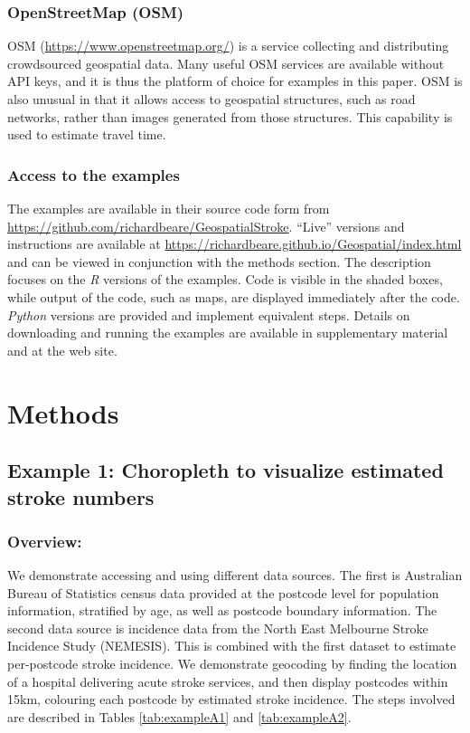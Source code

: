 \documentclass[utf8]{frontiersHLTH}
\begin{document}
\subsubsection{OpenStreetMap (OSM)}\label{openstreetmap-osm} OSM (\url{https://www.openstreetmap.org/}) is a service collecting and distributing crowdsourced geospatial data. Many useful OSM services are available without API keys, and it is thus the platform of choice for examples in this paper. OSM is also unusual in that it allows access to geospatial structures, such as road networks, rather than images generated from those structures. This capability is used to estimate travel time. 

\subsubsection{Access to the examples}\label{access-to-the-examples} The examples are available in their source code form from \href{https://github.com/richardbeare/GeospatialStroke}{https://github.com/richardbeare/GeospatialStroke}. ``Live'' versions and instructions are available at \href{https://richardbeare.github.io/Geospatial/index.html}{https://richardbeare.github.io/Geospatial/index.html} and can be viewed in conjunction with the methods section. The description focuses on the {\em R} versions of the examples. Code is visible in the shaded boxes, while output of the code, such as maps, are displayed immediately after the code. {\em Python} versions are provided and implement equivalent steps. Details on downloading and running the examples are available in supplementary material and at the web site. 

\section{Methods}\label{methods} 
\subsection{Example 1: Choropleth to visualize estimated stroke numbers}\label{example-1-choropleth-to-visualize-estimated-stroke-numbers} 

\subsubsection{Overview:}\label{overview} We demonstrate accessing and using different data sources. The first is Australian Bureau of Statistics census data provided at the postcode level for population information, stratified by age, as well as postcode boundary information. The second data source is incidence data from the North East Melbourne Stroke Incidence Study (NEMESIS)\cite{thrift_stroke_2000}. This is combined with the first dataset to estimate per-postcode stroke incidence. We demonstrate geocoding by finding the location of a hospital delivering acute stroke services, and then display postcodes within 15km, colouring each postcode by estimated stroke incidence. The steps involved are described in Tables \ref{tab:exampleA1} and \ref{tab:exampleA2}. 
\end{document}
